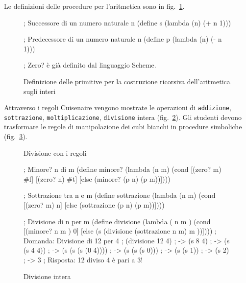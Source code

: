 \documentclass[withtimes]{easychair}
\begin{document}
Le definizioni delle procedure per l'aritmetica sono in fig.~\ref{fig:primitive-aritmetica}.

\begin{figure}
  \centering
  \begin{pygmented}[lang=scheme]
; Successore di un numero naturale n
(define s
  (lambda (n)
    (+ n 1)))

; Predecessore di un numero naturale n
(define p
  (lambda (n)
    (- n 1)))

; Zero? è già definito dal linguaggio Scheme. 

  \end{pygmented}
  \caption{Definizione delle primitive per la costruzione ricorsiva dell'aritmetica sugli interi}\label{fig:primitive-aritmetica}
\end{figure}

Attraverso i regoli Cuisenaire vengono mostrate le operazioni di \texttt{addizione}, \texttt{sottrazione}, \texttt{moltiplicazione}, \texttt{divisione} intera (fig.~\ref{fig:divisione-regoli}). Gli studenti devono trasformare le regole di manipolazione dei cubi bianchi in procedure simboliche (fig.~\ref{fig:divisione-scheme}).

\begin{figure}[h]
    \centering
    
    \caption{Divisione con i regoli\label{fig:divisione-regoli}}
\end{figure}


\begin{figure}
  \centering
  \begin{pygmented}[lang=scheme]
; Minore? n di m
(define minore?
  (lambda (n m)
    (cond
      [(zero? m) #f]
      [(zero? n) #t]
      [else (minore? (p n) (p m))])))

; Sottrazione tra n e m
(define sottrazione
  (lambda (n m)
    (cond
     [(zero? m) n]
     [else (sottrazione (p n) (p m))])))

; Divisione di n per m
(define divisione
  (lambda ( n m )
    (cond
     [(minore? n m ) 0]
     [else (s (divisione (sottrazione n m) m ))])))
; Domanda: Divisione di 12 per 4
; (divisione 12 4)
; -> (s 8 4)
; -> (s (s 4 4))
; -> (s (s (s (0 4))))
; -> (s (s (s 0)))
; -> (s (s 1))
; -> (s 2)
; -> 3
; Risposta: 12 diviso 4 è pari a 3!
  \end{pygmented}
  \caption{Divisione intera}\label{fig:divisione-scheme}
\end{figure}
\end{document}
